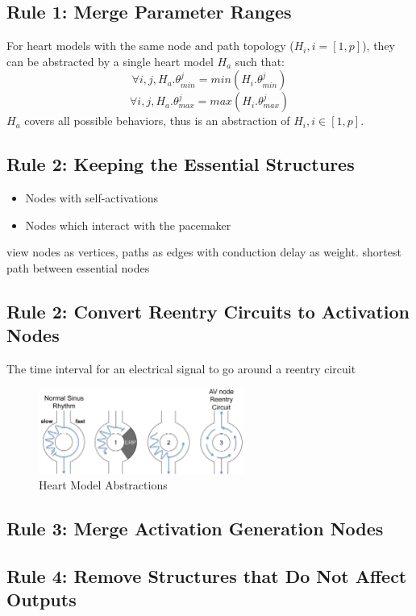 \subsection{Rule 1: Merge Parameter Ranges}
For heart models with the same node and path topology ($H_i,i=[1,p]$), they can be abstracted by a single heart model $H_a$ such that:
$$\forall i,j,H_a.\theta^j_{min}=min(H_i.\theta^j_{min})$$ 
$$\forall i,j,H_a.\theta^j_{max}=max(H_i.\theta^j_{max})$$ 
$H_a$ covers all possible behaviors, thus is an abstraction of $H_i, i\in [1,p]$.

\subsection{Rule 2: Keeping the Essential Structures}
\begin{itemize}
	\item Nodes with self-activations
	\item Nodes which interact with the pacemaker
\end{itemize}
view nodes as vertices, paths as edges with conduction delay as weight. shortest path between essential nodes
\subsection{Rule 2: Convert Reentry Circuits to Activation Nodes}
The time interval for an electrical signal to go around a reentry circuit
\begin{figure}[!h]
		\centering
		\includegraphics[width=0.6\textwidth]{figs/reentry.pdf}
		\caption{\small Heart Model Abstractions}
		\label{fig:reentry}
\end{figure}
\subsection{Rule 3: Merge Activation Generation Nodes}
\subsection{Rule 4: Remove Structures that Do Not Affect Outputs}
